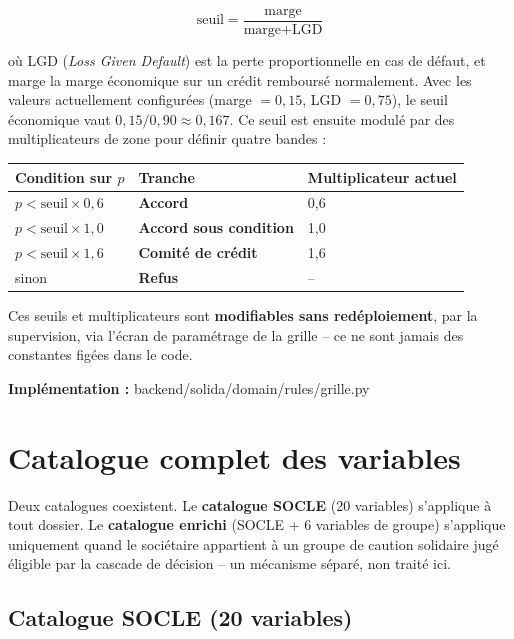 \documentclass[11pt,a4paper]{article}
\newcommand{\fichier}[1]{\noindent\textbf{Implémentation :} \tiny\ttfamily#1\normalfont\normalsize\par}
\begin{document}
\begin{equation}
\text{seuil} = \frac{\text{marge}}{\text{marge} + \text{LGD}}
\end{equation}

où LGD (\emph{Loss Given Default}) est la perte proportionnelle en cas de défaut, et marge la
marge économique sur un crédit remboursé normalement. Avec les valeurs actuellement configurées
(marge $= 0{,}15$, LGD $= 0{,}75$), le seuil économique vaut $0{,}15 / 0{,}90 \approx 0{,}167$. Ce
seuil est ensuite modulé par des multiplicateurs de zone pour définir quatre bandes :

\begin{center}
\begin{tabular}{lll}
\toprule
Condition sur $p$ & Tranche & Multiplicateur actuel \\
\midrule
$p < \text{seuil} \times 0{,}6$ & \textcolor{vertaccord}{\textbf{Accord}} & 0,6 \\
$p < \text{seuil} \times 1{,}0$ & \textcolor{orangevigilance}{\textbf{Accord sous condition}} & 1,0 \\
$p < \text{seuil} \times 1{,}6$ & \textbf{Comité de crédit} & 1,6 \\
sinon & \textcolor{rougerefus}{\textbf{Refus}} & -- \\
\bottomrule
\end{tabular}
\end{center}

Ces seuils et multiplicateurs sont \textbf{modifiables sans redéploiement}, par la supervision, via
l'écran de paramétrage de la grille -- ce ne sont jamais des constantes figées dans le code.

\fichier{backend/solida/domain/rules/grille.py}

\section{Catalogue complet des variables}

Deux catalogues coexistent. Le \textbf{catalogue SOCLE} (20 variables) s'applique à tout dossier.
Le \textbf{catalogue enrichi} (SOCLE + 6 variables de groupe) s'applique uniquement quand le
sociétaire appartient à un groupe de caution solidaire jugé éligible par la cascade de décision --
un mécanisme séparé, non traité ici.

\subsection{Catalogue SOCLE (20 variables)}
\end{document}
